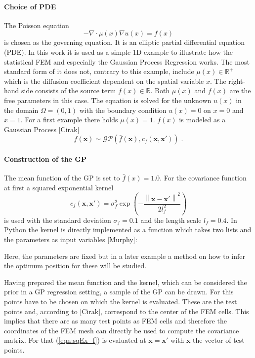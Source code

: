 \documentclass[%
  a4paper,oneside,%
  11pt,%
  smallchapters,
  green,%
  rgb, <cmyk>
  ,]{tubsbook}
\begin{document}
\paragraph{Choice of PDE}
The Poisson equation 
\begin{equation}
- \nabla \cdot \mu(x) \nabla u(x) = f(x)
\label{eqn:Poisson}
\end{equation}
is chosen as the governing equation. It is an elliptic partial differential equation (PDE). In this work it is used as a simple 1D example to illustrate how the statistical FEM and especially the Gaussian Process Regression works.
The most standard form of it does not, contrary to this example, include $\mu(x) \in \mathbb{R}^+$ which is the diffusion coefficient dependent on the spatial variable $x$. The right-hand side consists of the source term $f(x)\in \mathbb{R}$. Both $\mu (x)$ and $f(x)$ are the free parameters in this case. The equation is solved for the unknown  $u(x)$ in the domain $\Omega = (0,1)$ with the boundary condition $u(x) = 0$ on $x=0$ and $x=1$.
%
For a first example there holds $\mu(x)=1$. $f(x)$ is modeled as a Gaussian Process [Cirak]
%
\begin{equation}
f(\bm{x}) \sim \mathcal{GP} \left( \bar{f}(\bm{x}), c_f(\bm{x},\bm{x}')\right) \;.
\end{equation}
%
\paragraph{Construction of the GP}
The mean function of the GP is set to $\bar{f}(x) = 1.0$. For the covariance function at first a squared exponential kernel 
%
\begin{equation}
c_f(\bm{x},\bm{x}') =    \sigma_{f}^2 \exp \left(-  \frac{\left \| \bm{x}-{\bm{x}}' \right \|^2}{2l_{f}^2} \right )       
\label{eqn:sqEx_f}
\end{equation}
%
is used with the standard deviation $\sigma_{f} = 0.1$ and the length scale $l_{f} = 0.4$.
In Python the kernel is directly implemented as a function which takes two lists and the parameters as input variables [Murphy]:

%
Here, the parameters are fixed but in a later example a method on how to infer the optimum position for these will be studied.

Having prepared the mean function and the kernel, which can be considered the prior in a GP regression setting, a sample of the GP can be drawn. For this points have to be chosen on which the kernel is evaluated. These are the test points and, according to [Cirak], correspond to the center of the FEM cells. This implies that there are as many test points as FEM cells and therefore the coordinates of the FEM mesh can directly be used to compute the covariance matrix. For that (\ref{eqn:sqEx_f}) is evaluated at $\bm{x} = \bm{x}'$ with $\bm{x}$ the vector of test points. 
\end{document}

